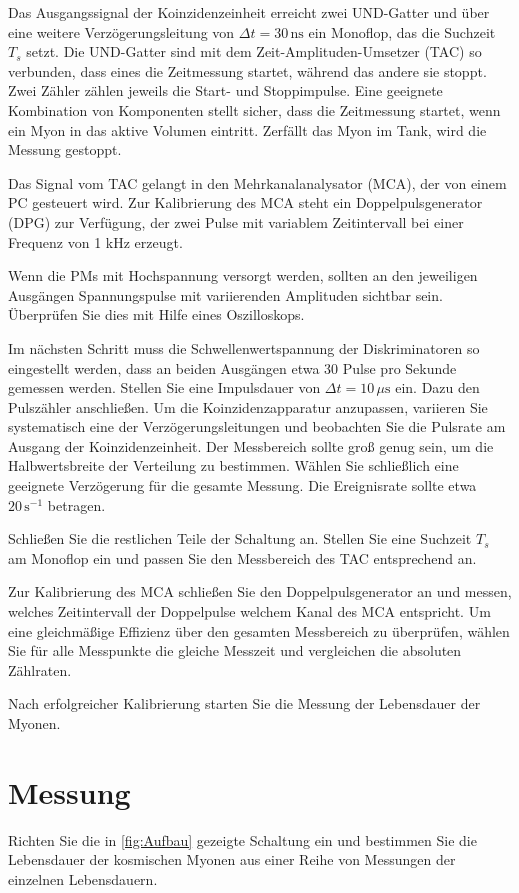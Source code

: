 Das Ausgangssignal der Koinzidenzeinheit erreicht zwei UND-Gatter und über eine weitere Verzögerungsleitung von $\Delta t = 30 \, \text{ns}$ ein Monoflop, das die Suchzeit $T_s$ setzt. Die UND-Gatter sind mit dem Zeit-Amplituden-Umsetzer (TAC) so verbunden, dass eines die Zeitmessung startet, während das andere sie stoppt. Zwei Zähler zählen jeweils die Start- und Stoppimpulse. Eine geeignete Kombination von Komponenten stellt sicher, dass die Zeitmessung startet, wenn ein Myon in das aktive Volumen eintritt. Zerfällt das Myon im Tank, wird die Messung gestoppt.

Das Signal vom TAC gelangt in den Mehrkanalanalysator (MCA), der von einem PC gesteuert wird. Zur Kalibrierung des MCA steht ein Doppelpulsgenerator (DPG) zur Verfügung, der zwei Pulse mit variablem Zeitintervall bei einer Frequenz von 1 kHz erzeugt.

Wenn die PMs mit Hochspannung versorgt werden, sollten an den jeweiligen Ausgängen Spannungspulse mit variierenden Amplituden sichtbar sein. Überprüfen Sie dies mit Hilfe eines Oszilloskops.

Im nächsten Schritt muss die Schwellenwertspannung der Diskriminatoren so eingestellt werden, dass an beiden Ausgängen etwa 30 Pulse pro Sekunde gemessen werden. Stellen Sie eine Impulsdauer von $\Delta t = 10 \, \mu\text{s}$ ein. Dazu den Pulszähler anschließen. Um die Koinzidenzapparatur anzupassen, variieren Sie systematisch eine der Verzögerungsleitungen und beobachten Sie die Pulsrate am Ausgang der Koinzidenzeinheit. Der Messbereich sollte groß genug sein, um die Halbwertsbreite der Verteilung zu bestimmen. Wählen Sie schließlich eine geeignete Verzögerung für die gesamte Messung. Die Ereignisrate sollte etwa $20 \, \text{s}^{-1}$ betragen.

Schließen Sie die restlichen Teile der Schaltung an. Stellen Sie eine Suchzeit $T_s$ am Monoflop ein und passen Sie den Messbereich des TAC entsprechend an.

Zur Kalibrierung des MCA schließen Sie den Doppelpulsgenerator an und messen, welches Zeitintervall der Doppelpulse welchem Kanal des MCA entspricht. Um eine gleichmäßige Effizienz über den gesamten Messbereich zu überprüfen, wählen Sie für alle Messpunkte die gleiche Messzeit und vergleichen die absoluten Zählraten.

Nach erfolgreicher Kalibrierung starten Sie die Messung der Lebensdauer der Myonen.

\section{Messung}

Richten Sie die in \autoref{fig:Aufbau} gezeigte Schaltung ein und bestimmen Sie die Lebensdauer der kosmischen Myonen aus einer Reihe von Messungen der einzelnen Lebensdauern.

